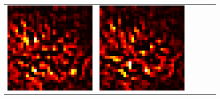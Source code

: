 \documentclass[preprint,12pt]{elsarticle}
\begin{document}
\begin{figure}[p]
\begin{tabular}{cccccc}
  \includegraphics[scale=\scale]{../visualizations/examples/cifar10/resnet18/positive_saliency_map/8.png} & 
  \includegraphics[scale=\scale]{../visualizations/examples/cifar10/resnet18/negative_saliency_map/8.png} & 

\end{tabular}
\end{figure}
\end{document}
